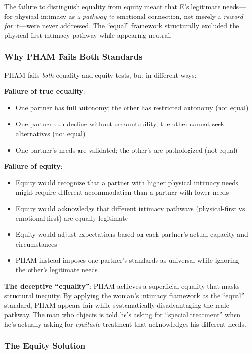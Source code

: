 \documentclass[12pt, letterpaper]{article}
\begin{document}
The failure to distinguish equality from equity meant that E's legitimate needs---for physical intimacy as a \textit{pathway to} emotional connection, not merely a \textit{reward for} it---were never addressed. The ``equal'' framework structurally excluded the physical-first intimacy pathway while appearing neutral.

\subsubsection{Why PHAM Fails Both Standards}

PHAM fails \textit{both} equality and equity tests, but in different ways:

\textbf{Failure of true equality}:
\begin{itemize}
    \item One partner has full autonomy; the other has restricted autonomy (not equal)
    \item One partner can decline without accountability; the other cannot seek alternatives (not equal)
    \item One partner's needs are validated; the other's are pathologized (not equal)
\end{itemize}

\textbf{Failure of equity}:
\begin{itemize}
    \item Equity would recognize that a partner with higher physical intimacy needs might require different accommodation than a partner with lower needs
    \item Equity would acknowledge that different intimacy pathways (physical-first vs. emotional-first) are equally legitimate
    \item Equity would adjust expectations based on each partner's actual capacity and circumstances
    \item PHAM instead imposes one partner's standards as universal while ignoring the other's legitimate needs
\end{itemize}

\textbf{The deceptive ``equality''}: PHAM achieves a superficial equality that masks structural inequity. By applying the woman's intimacy framework as the ``equal'' standard, PHAM appears fair while systematically disadvantaging the male pathway. The man who objects is told he's asking for ``special treatment'' when he's actually asking for \textit{equitable} treatment that acknowledges his different needs.

\subsubsection{The Equity Solution}
\end{document}
